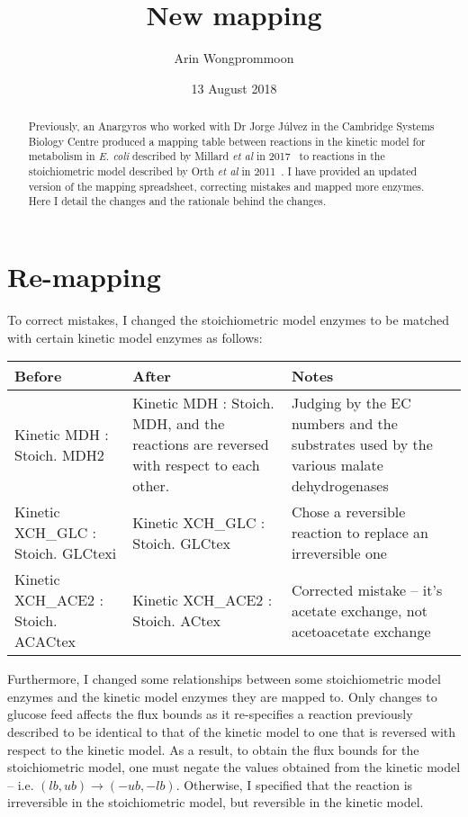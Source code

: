 \documentclass[parskip=full]{scrreprt}
\author{Arin Wongprommoon}
\title{New mapping}
\date{13 August 2018}
\begin{document}
\maketitle

\tableofcontents

\begin{abstract}
 Previously, an Anargyros who worked with Dr Jorge J\'ulvez in the Cambridge Systems Biology Centre produced a mapping table between reactions in the kinetic model for metabolism in \emph{E. coli} described by Millard \emph{et al} in 2017~\cite{millard_metabolic_2017} to reactions in the stoichiometric model described by Orth \emph{et al} in 2011~\cite{orth_comprehensive_2011}. I have provided an updated version of the mapping spreadsheet, correcting mistakes and mapped more enzymes. Here I detail the changes and the rationale behind the changes.
\end{abstract}

\chapter{Re-mapping}
\label{ch:remapping}

To correct mistakes, I changed the stoichiometric model enzymes to be matched with certain kinetic model enzymes as follows:

\begin{tabularx}{\linewidth}{|L|L|L|}
  \hline
  Before & After & Notes\\
  \hline
  Kinetic MDH : Stoich. MDH2 & Kinetic MDH : Stoich. MDH, and the reactions are reversed with respect to each other. & Judging by the EC numbers and the substrates used by the various malate dehydrogenases\\
  \hline
  Kinetic XCH\_GLC : Stoich. GLCtexi & Kinetic XCH\_GLC : Stoich. GLCtex & Chose a reversible reaction to replace an irreversible one\\
  \hline
  Kinetic XCH\_ACE2 : Stoich. ACACtex & Kinetic XCH\_ACE2 : Stoich. ACtex & Corrected mistake -- it's acetate exchange, not acetoacetate exchange\\
  \hline
\end{tabularx}

Furthermore, I changed some relationships between some stoichiometric model enzymes and the kinetic model enzymes they are mapped to. Only changes to glucose feed affects the flux bounds as it re-specifies a reaction previously described to be identical to that of the kinetic model to one that is reversed with respect to the kinetic model. As a result, to obtain the flux bounds for the stoichiometric model, one must negate the values obtained from the kinetic model -- i.e. $(lb, ub) \rightarrow (-ub, -lb)$. Otherwise, I specified that the reaction is irreversible in the stoichiometric model, but reversible in the kinetic model.
\end{document}
